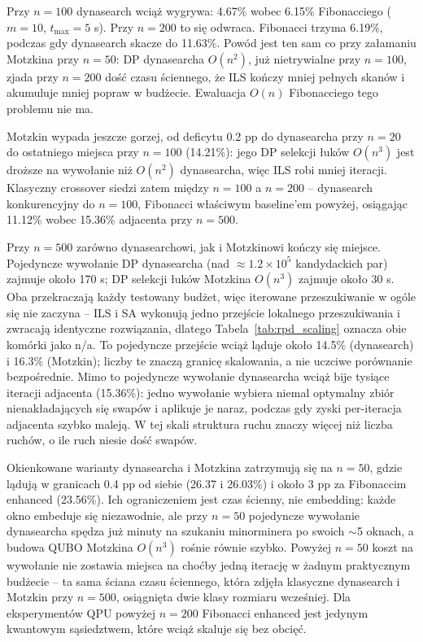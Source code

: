 \documentclass[11pt,a4paper]{article}
\begin{document}
Przy $n=100$ dynasearch wciąż wygrywa: 4.67\% wobec 6.15\%
Fibonacciego ($m=10$, $t_{\max}=5$ s). Przy $n=200$ to się odwraca.
Fibonacci trzyma 6.19\%, podczas gdy dynasearch skacze do 11.63\%.
Powód jest ten sam co przy załamaniu Motzkina przy $n=50$: DP
dynasearcha $O(n^2)$, już nietrywialne przy $n=100$, zjada przy
$n=200$ dość czasu ściennego, że ILS kończy mniej pełnych skanów
i akumuluje mniej popraw w budżecie. Ewaluacja $O(n)$ Fibonacciego
tego problemu nie ma.

Motzkin wypada jeszcze gorzej, od deficytu 0.2 pp do dynasearcha przy
$n=20$ do ostatniego miejsca przy $n=100$ (14.21\%): jego DP selekcji
łuków $O(n^3)$ jest droższe na wywołanie niż $O(n^2)$ dynasearcha,
więc ILS robi mniej iteracji. Klasyczny crossover siedzi zatem między
$n=100$ a $n=200$ -- dynasearch konkurencyjny do $n=100$, Fibonacci
właściwym baseline'em powyżej, osiągając 11.12\% wobec 15.36\%
adjacenta przy $n=500$.

Przy $n=500$ zarówno dynasearchowi, jak i Motzkinowi kończy się
miejsce. Pojedyncze wywołanie DP dynasearcha (nad
$\approx1.2\times10^5$ kandydackich par) zajmuje około 170 s; DP
selekcji łuków Motzkina $O(n^3)$ zajmuje około 30 s. Oba przekraczają
każdy testowany budżet, więc iterowane przeszukiwanie w ogóle się nie
zaczyna -- ILS i SA wykonują jedno przejście lokalnego przeszukiwania
i zwracają identyczne rozwiązania, dlatego Tabela~\ref{tab:rpd_scaling}
oznacza obie komórki jako n/a. To pojedyncze przejście wciąż ląduje
około 14.5\% (dynasearch) i 16.3\% (Motzkin); liczby te znaczą granicę
skalowania, a nie uczciwe porównanie bezpośrednie. Mimo to
pojedyncze wywołanie dynasearcha wciąż bije tysiące iteracji adjacenta
(15.36\%): jedno wywołanie wybiera niemal optymalny zbiór
nienakładających się swapów i aplikuje je naraz, podczas gdy zyski
per-iteracja adjacenta szybko maleją. W tej skali struktura ruchu
znaczy więcej niż liczba ruchów, o ile ruch niesie dość swapów.

Okienkowane warianty dynasearcha i Motzkina zatrzymują się na
$n=50$, gdzie lądują w granicach 0.4 pp od siebie (26.37 i 26.03\%)
i około 3 pp za Fibonaccim enhanced (23.56\%). Ich ograniczeniem jest
czas ścienny, nie embedding: każde okno embeduje się niezawodnie, ale
przy $n=50$ pojedyncze wywołanie dynasearcha spędza już minuty na
szukaniu minorminera po swoich $\sim$5 oknach, a budowa QUBO Motzkina
$O(n^3)$ rośnie równie szybko. Powyżej $n=50$ koszt na wywołanie nie
zostawia miejsca na choćby jedną iterację w żadnym praktycznym
budżecie -- ta sama ściana czasu ściennego, która zdjęła klasyczne
dynasearch i Motzkin przy $n=500$, osiągnięta dwie klasy rozmiaru
wcześniej. Dla eksperymentów QPU powyżej $n=200$ Fibonacci enhanced
jest jedynym kwantowym sąsiedztwem, które wciąż skaluje się bez
obcięć.
\end{document}
